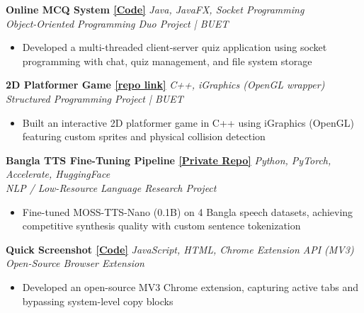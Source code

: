 \documentclass[letterpaper,11pt]{article}
\newcommand{\cvproject}[3]{%
  \noindent
  \textbf{#1} \hfill \textit{#2} \\
  \textit{#3}
}
\begin{document}
\vspace{4pt}

\cvproject
  {Online MCQ System \href{https://github.com/rishofficial/online_mcq_system}{\small[Code]}}
  {Java, JavaFX, Socket Programming}
  {Object-Oriented Programming Duo Project | BUET}
\begin{itemize}[leftmargin=*, noitemsep, topsep=1pt, parsep=0pt]
  \item Developed a multi-threaded client-server quiz application using socket programming with chat, quiz management, and file system storage
\end{itemize}

\vspace{4pt}

\cvproject
  {2D Platformer Game \href{https://github.com/rishofficial/platformer_}{\small[repo link]}}
  {C++, iGraphics (OpenGL wrapper)}
  {Structured Programming Project | BUET}
\begin{itemize}[leftmargin=*, noitemsep, topsep=1pt, parsep=0pt]
  \item Built an interactive 2D platformer game in C++ using iGraphics (OpenGL) featuring custom sprites and physical collision detection
\end{itemize}

\vspace{4pt}

\cvproject
  {Bangla TTS Fine-Tuning Pipeline \href{https://github.com/rishofficial}{\small[Private Repo]}}
  {Python, PyTorch, Accelerate, HuggingFace}
  {NLP / Low-Resource Language Research Project}
\begin{itemize}[leftmargin=*, noitemsep, topsep=1pt, parsep=0pt]
  \item Fine-tuned MOSS-TTS-Nano (0.1B) on 4 Bangla speech datasets, achieving competitive synthesis quality with custom sentence tokenization
\end{itemize}

\vspace{4pt}

\cvproject
  {Quick Screenshot \href{https://github.com/rishofficial/snap_screenshot}{\small[Code]}}
  {JavaScript, HTML, Chrome Extension API (MV3)}
  {Open-Source Browser Extension}
\begin{itemize}[leftmargin=*, noitemsep, topsep=1pt, parsep=0pt]
  \item Developed an open-source MV3 Chrome extension, capturing active tabs and bypassing system-level copy blocks
\end{itemize}
\end{document}
